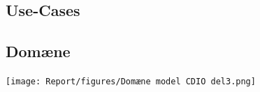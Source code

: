 \subsection{Use-Cases}


\subsection{Domæne}
\texttt{[image: Report/figures/Domæne model CDIO del3.png]}~\\[1cm]
